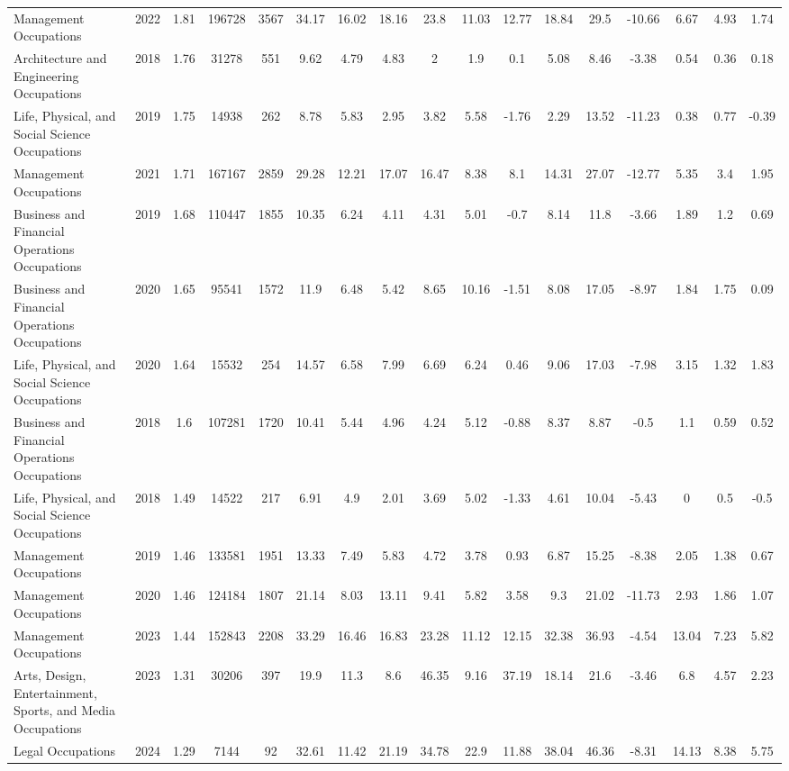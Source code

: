 \begin{landscape}
\begin{table}[htbp]
\begin{tabular}{lcccccccccccccccc}
Management Occupations & 2022 & 1.81 & 196728 & 3567 & 34.17 & 16.02 & 18.16 & 23.8 & 11.03 & 12.77 & 18.84 & 29.5 & -10.66 & 6.67 & 4.93 & 1.74 \\
Architecture and Engineering Occupations & 2018 & 1.76 & 31278 & 551 & 9.62 & 4.79 & 4.83 & 2 & 1.9 & 0.1 & 5.08 & 8.46 & -3.38 & 0.54 & 0.36 & 0.18 \\
Life, Physical, and Social Science Occupations & 2019 & 1.75 & 14938 & 262 & 8.78 & 5.83 & 2.95 & 3.82 & 5.58 & -1.76 & 2.29 & 13.52 & -11.23 & 0.38 & 0.77 & -0.39 \\
Management Occupations & 2021 & 1.71 & 167167 & 2859 & 29.28 & 12.21 & 17.07 & 16.47 & 8.38 & 8.1 & 14.31 & 27.07 & -12.77 & 5.35 & 3.4 & 1.95 \\
Business and Financial Operations Occupations & 2019 & 1.68 & 110447 & 1855 & 10.35 & 6.24 & 4.11 & 4.31 & 5.01 & -0.7 & 8.14 & 11.8 & -3.66 & 1.89 & 1.2 & 0.69 \\
Business and Financial Operations Occupations & 2020 & 1.65 & 95541 & 1572 & 11.9 & 6.48 & 5.42 & 8.65 & 10.16 & -1.51 & 8.08 & 17.05 & -8.97 & 1.84 & 1.75 & 0.09 \\
Life, Physical, and Social Science Occupations & 2020 & 1.64 & 15532 & 254 & 14.57 & 6.58 & 7.99 & 6.69 & 6.24 & 0.46 & 9.06 & 17.03 & -7.98 & 3.15 & 1.32 & 1.83 \\
Business and Financial Operations Occupations & 2018 & 1.6 & 107281 & 1720 & 10.41 & 5.44 & 4.96 & 4.24 & 5.12 & -0.88 & 8.37 & 8.87 & -0.5 & 1.1 & 0.59 & 0.52 \\
Life, Physical, and Social Science Occupations & 2018 & 1.49 & 14522 & 217 & 6.91 & 4.9 & 2.01 & 3.69 & 5.02 & -1.33 & 4.61 & 10.04 & -5.43 & 0 & 0.5 & -0.5 \\
Management Occupations & 2019 & 1.46 & 133581 & 1951 & 13.33 & 7.49 & 5.83 & 4.72 & 3.78 & 0.93 & 6.87 & 15.25 & -8.38 & 2.05 & 1.38 & 0.67 \\
Management Occupations & 2020 & 1.46 & 124184 & 1807 & 21.14 & 8.03 & 13.11 & 9.41 & 5.82 & 3.58 & 9.3 & 21.02 & -11.73 & 2.93 & 1.86 & 1.07 \\
Management Occupations & 2023 & 1.44 & 152843 & 2208 & 33.29 & 16.46 & 16.83 & 23.28 & 11.12 & 12.15 & 32.38 & 36.93 & -4.54 & 13.04 & 7.23 & 5.82 \\
Arts, Design, Entertainment, Sports, and Media Occupations & 2023 & 1.31 & 30206 & 397 & 19.9 & 11.3 & 8.6 & 46.35 & 9.16 & 37.19 & 18.14 & 21.6 & -3.46 & 6.8 & 4.57 & 2.23 \\
Legal Occupations & 2024 & 1.29 & 7144 & 92 & 32.61 & 11.42 & 21.19 & 34.78 & 22.9 & 11.88 & 38.04 & 46.36 & -8.31 & 14.13 & 8.38 & 5.75 \\

\end{tabular}
\end{table}
\end{landscape}
